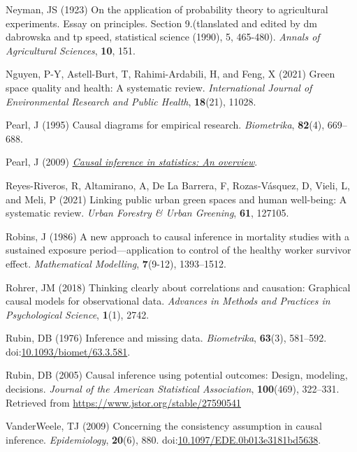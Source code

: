 \documentclass[
  singlecolumn]{article}
\newlength{\cslhangindent}
\newenvironment{CSLReferences}[2] %
 {\begin{list}{}{%
  \setlength{\itemindent}{0pt}
  \setlength{\leftmargin}{0pt}
  \setlength{\parsep}{0pt}
  \ifodd #1
   \setlength{\leftmargin}{\cslhangindent}
   \setlength{\itemindent}{-1\cslhangindent}
  \fi
  \setlength{\itemsep}{#2\baselineskip}}}
 {\end{list}}
\begin{document}
\begin{CSLReferences}{1}{0}
Neyman, JS (1923) On the application of probability theory to
agricultural experiments. Essay on principles. Section 9.(tlanslated and
edited by dm dabrowska and tp speed, statistical science (1990), 5,
465-480). \emph{Annals of Agricultural Sciences}, \textbf{10}, 151.

Nguyen, P-Y, Astell-Burt, T, Rahimi-Ardabili, H, and Feng, X (2021)
Green space quality and health: A systematic review. \emph{International
Journal of Environmental Research and Public Health}, \textbf{18}(21),
11028.

Pearl, J (1995) Causal diagrams for empirical research.
\emph{Biometrika}, \textbf{82}(4), 669--688.

Pearl, J (2009) \emph{\href{https://doi.org/10.1214/09-SS057}{Causal
inference in statistics: An overview}}.

Reyes-Riveros, R, Altamirano, A, De La Barrera, F, Rozas-Vásquez, D,
Vieli, L, and Meli, P (2021) Linking public urban green spaces and human
well-being: A systematic review. \emph{Urban Forestry \& Urban
Greening}, \textbf{61}, 127105.

Robins, J (1986) A new approach to causal inference in mortality studies
with a sustained exposure period---application to control of the healthy
worker survivor effect. \emph{Mathematical Modelling}, \textbf{7}(9-12),
1393--1512.

Rohrer, JM (2018) Thinking clearly about correlations and causation:
Graphical causal models for observational data. \emph{Advances in
Methods and Practices in Psychological Science}, \textbf{1}(1), 2742.

Rubin, DB (1976) Inference and missing data. \emph{Biometrika},
\textbf{63}(3), 581--592.
doi:\href{https://doi.org/10.1093/biomet/63.3.581}{10.1093/biomet/63.3.581}.

Rubin, DB (2005) Causal inference using potential outcomes: Design,
modeling, decisions. \emph{Journal of the American Statistical
Association}, \textbf{100}(469), 322--331. Retrieved from
\url{https://www.jstor.org/stable/27590541}

VanderWeele, TJ (2009) Concerning the consistency assumption in causal
inference. \emph{Epidemiology}, \textbf{20}(6), 880.
doi:\href{https://doi.org/10.1097/EDE.0b013e3181bd5638}{10.1097/EDE.0b013e3181bd5638}.


\end{CSLReferences}
\end{document}
